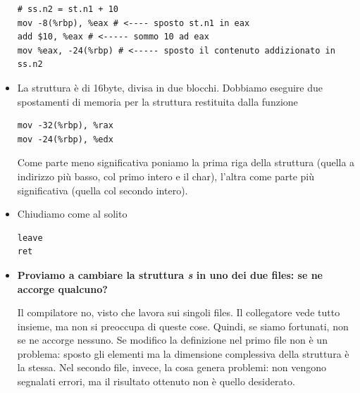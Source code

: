 \documentclass[11pt]{report}
\theoremstyle{definition}
\begin{document}
\begin{itemize}
\begin{verbatim}
# ss.n2 = st.n1 + 10
mov -8(%rbp), %eax # <---- sposto st.n1 in eax
add $10, %eax # <----- sommo 10 ad eax
mov %eax, -24(%rbp) # <----- sposto il contenuto addizionato in ss.n2
\end{verbatim}
\item La struttura è di 16byte, divisa in due blocchi. Dobbiamo eseguire due spostamenti di memoria per la struttura restituita dalla funzione 
\begin{verbatim}
mov -32(%rbp), %rax
mov -24(%rbp), %edx
\end{verbatim}
Come parte meno significativa poniamo la prima riga della struttura (quella a indirizzo più basso, col primo intero e il char), l'altra come parte più significativa (quella col secondo intero).
\item Chiudiamo come al solito
\begin{verbatim}
leave
ret
\end{verbatim}
\item \textbf{Proviamo a cambiare la struttura \emph{s} in uno dei due files: se ne accorge qualcuno?}

Il compilatore no, visto che lavora sui singoli files. Il collegatore vede tutto insieme, ma non si preoccupa di queste cose. Quindi, se siamo fortunati, non se ne accorge nessuno. Se modifico la definizione nel primo file non è un problema: sposto gli elementi ma la dimensione complessiva della struttura è la stessa. Nel secondo file, invece, la cosa genera problemi: non vengono segnalati errori, ma il risultato ottenuto non è quello desiderato.
\end{itemize}
\end{document}
